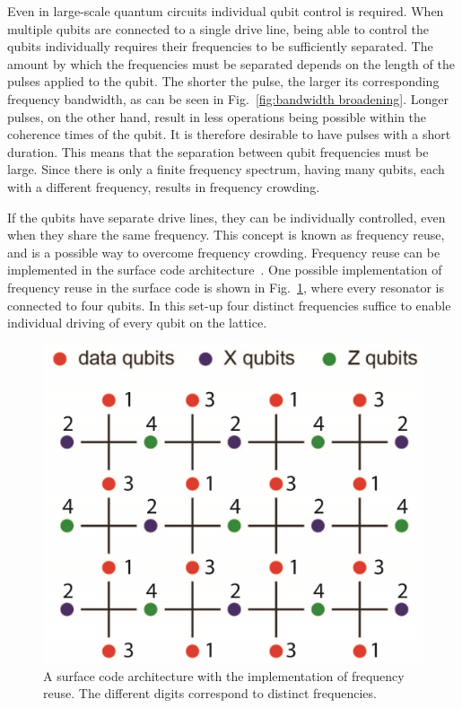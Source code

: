       Even in large-scale quantum circuits individual qubit control is required. When multiple qubits are connected to a single drive line, being able to control the qubits individually requires their frequencies to be sufficiently separated. The amount by which the frequencies must be separated depends on the length of the pulses applied to the qubit. The shorter the pulse, the larger its corresponding frequency bandwidth, as can be seen in Fig.~\ref{fig:bandwidth broadening}. Longer pulses, on the other hand, result in less operations being possible within the coherence times of the qubit. It is therefore desirable to have pulses with a short duration. This means that the separation between qubit frequencies must be large. Since there is only a finite frequency spectrum, having many qubits, each with a different frequency, results in frequency crowding.

      If the qubits have separate drive lines, they can be individually controlled, even when they share the same frequency. This concept is known as frequency reuse, and is a possible way to overcome frequency crowding. Frequency reuse can be implemented in the surface code architecture~\cite{fowler2009high}. One possible implementation of frequency reuse in the surface code is shown in Fig.~\ref{fig:surface code frequency reuse}, where every resonator is connected to four qubits. In this set-up four distinct frequencies suffice to enable individual driving of every qubit on the lattice.

      \begin{figure}[h]
        \centering
        \includegraphics[width=.6\textwidth]{Figures/Exploring frequency reuse/surface_code_frequency re-use_cut.jpg}
        \caption{A surface code architecture with the implementation of frequency reuse. The different digits correspond to distinct frequencies. }
        \label{fig:surface code frequency reuse}
      \end{figure}

